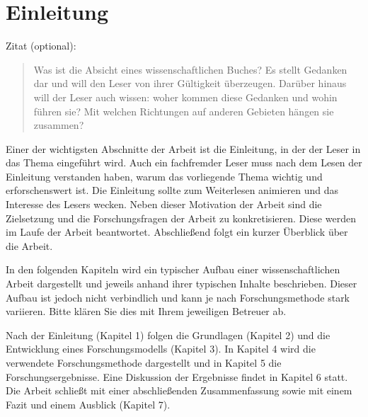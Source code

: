 \section{Einleitung}
\lbrack Zitat (optional)\rbrack :
\begin{quote}
\glqq Was ist die Absicht eines wissenschaftlichen Buches? Es stellt Gedanken dar und will den Leser von ihrer Gültigkeit überzeugen. Darüber hinaus will der Leser auch wissen: woher kommen diese Gedanken und wohin führen sie? Mit welchen Richtungen auf anderen Gebieten hängen sie zusammen?\grqq
{}
\end{quote}

Einer der wichtigsten Abschnitte der Arbeit ist die Einleitung, in der der Leser in das Thema eingeführt wird. Auch ein fachfremder Leser muss nach dem Lesen der Einleitung verstanden haben, warum das vorliegende Thema wichtig und erforschenswert ist. Die Einleitung sollte zum Weiterlesen animieren und das Interesse des Lesers wecken. Neben dieser Motivation der Arbeit sind die Zielsetzung und die Forschungsfragen der Arbeit zu konkretisieren. Diese werden im Laufe der Arbeit beantwortet. Abschließend folgt ein kurzer Überblick über die Arbeit.\par\medskip
In den folgenden Kapiteln wird ein typischer Aufbau einer wissenschaftlichen Arbeit dargestellt und jeweils anhand ihrer typischen Inhalte beschrieben. Dieser Aufbau ist jedoch nicht verbindlich und kann je nach Forschungsmethode stark variieren. Bitte klären Sie dies mit Ihrem jeweiligen Betreuer ab.\par\medskip
Nach der Einleitung (Kapitel 1) folgen die Grundlagen (Kapitel 2) und die Entwicklung eines Forschungsmodells (Kapitel 3). In Kapitel 4 wird die verwendete Forschungsmethode dargestellt und in Kapitel 5 die Forschungsergebnisse. Eine Diskussion der Ergebnisse findet in Kapitel 6 statt. Die Arbeit schließt mit einer abschließenden Zusammenfassung sowie mit einem Fazit und einem Ausblick (Kapitel 7).

